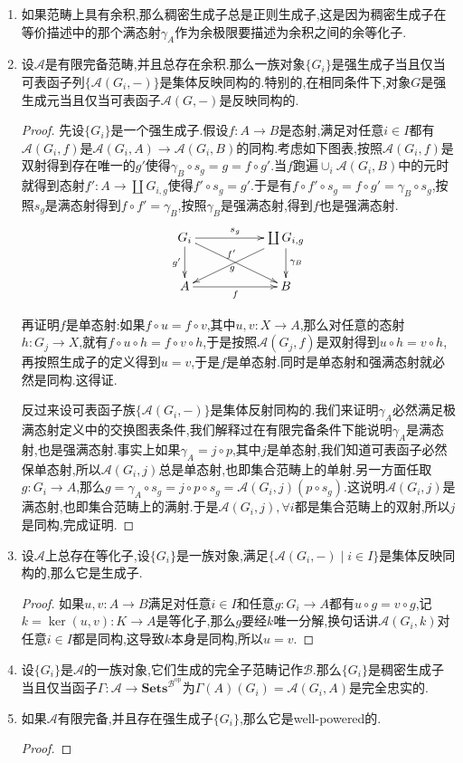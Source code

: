 \begin{enumerate}
	\item 如果范畴上具有余积,那么稠密生成子总是正则生成子,这是因为稠密生成子在等价描述中的那个满态射$\gamma_A$作为余极限要描述为余积之间的余等化子.
	\item 设$\mathscr{A}$是有限完备范畴,并且总存在余积.那么一族对象$\{G_i\}$是强生成子当且仅当可表函子列$\{\mathscr{A}(G_i,-)\}$是集体反映同构的.特别的,在相同条件下,对象$G$是强生成元当且仅当可表函子$\mathscr{A}(G,-)$是反映同构的.
	\begin{proof}
		
		先设$\{G_i\}$是一个强生成子.假设$f:A\to B$是态射,满足对任意$i\in I$都有$\mathscr{A}(G_i,f)$是$\mathscr{A}(G_i,A)\to\mathscr{A}(G_i,B)$的同构.考虑如下图表,按照$\mathscr{A}(G_i,f)$是双射得到存在唯一的$g'$使得$\gamma_B\circ s_g=g=f\circ g'$.当$f$跑遍$\cup_i\mathscr{A}(G_i,B)$中的元时就得到态射$f':A\to\coprod G_{i,g}$使得$f'\circ s_g=g'$.于是有$f\circ f'\circ s_g=f\circ g'=\gamma_B\circ s_g$,按照$s_g$是满态射得到$f\circ f'=\gamma_B$,按照$\gamma_B$是强满态射,得到$f$也是强满态射.
		$$\xymatrix{G_i\ar[rr]^{s_g}\ar[d]_{g'}\ar[drr]_{g}&&\coprod G_{i,g}\ar[d]^{\gamma_B}\ar[dll]_{f'}\\A\ar[rr]_f&&B}$$
		
		再证明$f$是单态射:如果$f\circ u=f\circ v$,其中$u,v:X\to A$,那么对任意的态射$h:G_j\to X$,就有$f\circ u\circ h=f\circ v\circ h$,于是按照$\mathscr{A}(G_j,f)$是双射得到$u\circ h=v\circ h$,再按照生成子的定义得到$u=v$,于是$f$是单态射.同时是单态射和强满态射就必然是同构.这得证.
		
		\qquad
		
		反过来设可表函子族$\{\mathscr{A}(G_i,-)\}$是集体反射同构的.我们来证明$\gamma_A$必然满足极满态射定义中的交换图表条件,我们解释过在有限完备条件下能说明$\gamma_A$是满态射,也是强满态射.事实上如果$\gamma_A=j\circ p$,其中$j$是单态射,我们知道可表函子必然保单态射,所以$\mathscr{A}(G_i,j)$总是单态射,也即集合范畴上的单射.另一方面任取$g:G_i\to A$,那么$g=\gamma_A\circ s_g=j\circ p\circ s_g=\mathscr{A}(G_i,j)(p\circ s_g)$.这说明$\mathscr{A}(G_i,j)$是满态射,也即集合范畴上的满射.于是$\mathscr{A}(G_i,j),\forall i$都是集合范畴上的双射,所以$j$是同构,完成证明.
	\end{proof}
    \item 设$\mathscr{A}$上总存在等化子,设$\{G_i\}$是一族对象,满足$\{\mathscr{A}(G_i,-)\mid i\in I\}$是集体反映同构的,那么它是生成子.
    \begin{proof}
    	
    	如果$u,v:A\to B$满足对任意$i\in I$和任意$g:G_i\to A$都有$u\circ g=v\circ g$,记$k=\ker(u,v):K\to A$是等化子,那么$g$要经$k$唯一分解,换句话讲$\mathscr{A}(G_i,k)$对任意$i\in I$都是同构,这导致$k$本身是同构,所以$u=v$.
    \end{proof}
    \item 设$\{G_i\}$是$\mathscr{A}$的一族对象,它们生成的完全子范畴记作$\mathscr{B}$.那么$\{G_i\}$是稠密生成子当且仅当函子$\Gamma:\mathscr{A}\to\textbf{Sets}^{\mathscr{B}^{\mathrm{op}}}$为$\Gamma(A)(G_i)=\mathscr{A}(G_i,A)$是完全忠实的.
    \item 如果$\mathscr{A}$有限完备,并且存在强生成子$\{G_i\}$,那么它是well-powered的.
    \begin{proof}
    	

\end{proof}
\end{enumerate}
